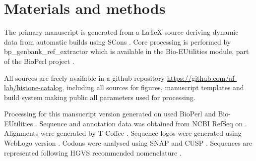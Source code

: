 \section{Materials and methods}
\label{sec:matmethods}

  The primary manuscript is generated from a \LaTeX{} source
  deriving dynamic data from automatic builds using SCons \citep{SCons2005}.
  Core processing is performed by bp\_genbank\_ref\_extractor
  which is available in the Bio-EUtilities module, part of the
  BioPerl project \citep{bioperl}.

  All sources are freely available in a github repository
  \url{https://github.com/af-lab/histone-catalog}, including all
  sources for figures, manuscript templates and build system making public
  all parameters used for processing.

  Processing for this mansucript version generated on 
  used BioPerl \BioPerlVersion{} and Bio-EUtilities \BioEUtilitiesVersion{}.
  Sequence and annotation data was obtained from NCBI RefSeq \citep{PruittRefseq2014}
  on \printdate{\SequencesDate{}}.
  Alignments were generated by T-Coffee \TCoffeVersion{} \citep{tcoffee2000}.
  Sequence logos were generated using WebLogo version  \citep{weblogo}.
  Codons were analysed using SNAP  \citep{KorberSNAP2000}
  and CUSP  \citep{Emboss2000}.
  Sequences are represented following HGVS recommended nomenclature \citep{mutnomenclature2003}.
